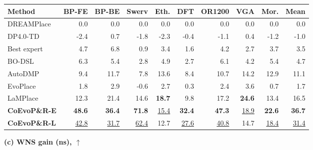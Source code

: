 \begin{table}[t]
\begin{minipage}[t]{0.492\textwidth}
\begin{tabular*}{\linewidth}{
  @{\extracolsep{\fill}} l *{9}{r} @{}
}
\toprule
Method
& BP-FE & BP-BE & Swerv & Eth.
& DFT & OR1200 & VGA & Mor. & Mean \\
\midrule
DREAMPlace       & 0.0 & 0.0 & 0.0 & 0.0 & 0.0 & 0.0 & 0.0 & 0.0 & 0.0 \\
DP4.0-TD         & -2.4 & 0.7 & -1.8 & -2.3 & -0.4 & -1.1 & 0.4 & -1.2 & -1.0 \\
Best expert      & 4.7 & 6.8 & 0.9 & 3.4 & 1.6 & 4.2 & 2.7 & 3.7 & 3.5 \\
BO-DSL           & 6.3 & 5.4 & 2.8 & 4.9 & 2.7 & 6.1 & 4.2 & 5.4 & 4.7 \\
AutoDMP          & 9.4 & 11.7 & 7.8 & 13.6 & 8.4 & 10.7 & 14.2 & 12.9 & 11.1 \\
EvoPlace         & 1.8 & 2.9 & -0.6 & 2.7 & 0.3 & 2.4 & 3.6 & 0.7 & 1.7 \\
LaMPlace         & 12.3 & 21.4 & 14.6 & \cellcolor{rankfirst}\textbf{18.7} & 9.8 & 17.2 & \cellcolor{rankfirst}\textbf{24.6} & 13.4 & 16.5 \\
\midrule
\textbf{CoEvoP\&R-E}
                 & \cellcolor{rankfirst}\textbf{48.6} & \cellcolor{rankfirst}\textbf{36.4} & \cellcolor{rankfirst}\textbf{71.8} & \cellcolor{ranksecond}\underline{15.4} & \cellcolor{rankfirst}\textbf{32.4} & \cellcolor{rankfirst}\textbf{47.3} & \cellcolor{ranksecond}\underline{18.9} & \cellcolor{rankfirst}\textbf{22.6} & \cellcolor{rankfirst}\textbf{36.7} \\
\textbf{CoEvoP\&R-L}
                 & \cellcolor{ranksecond}\underline{42.8} & \cellcolor{ranksecond}\underline{31.7} & \cellcolor{ranksecond}\underline{62.4} & 12.7 & \cellcolor{ranksecond}\underline{27.6} & \cellcolor{ranksecond}\underline{40.8} & 14.7 & \cellcolor{ranksecond}\underline{18.4} & \cellcolor{ranksecond}\underline{31.4} \\
\bottomrule
\end{tabular*}
\end{minipage}

\vspace{5pt}

\begin{minipage}[t]{0.492\textwidth}
\centering
\textbf{(c) WNS gain (ns), $\uparrow$}\par
\vspace{2pt}
\setlength{\tabcolsep}{0.5pt}


\end{minipage}
\end{table}
